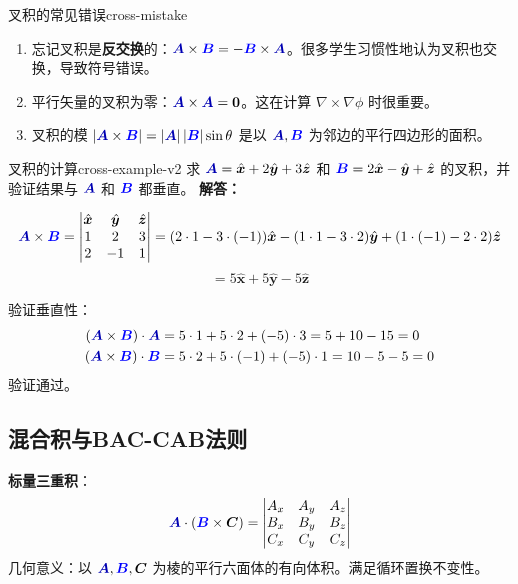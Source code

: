 \documentclass[11pt,a4paper,openany,oneside]{book}
\newcommand{\vecB}{\textcolor{blue}{\vect{B}}}
\newcommand{\vecA}{\textcolor{blue!70!black}{\vect{A}}}
\newcommand{\vect}[1]{\bm{#1}}
\newcommand{\unitvec}[1]{\hat{\vect{#1}}}
\newcommand{\difficulty}[1]{\marginnote{\textcolor{red}{\textbf{[#1]}}}}
\begin{document}
\begin{warning}{叉积的常见错误}{cross-mistake}
\begin{enumerate}
\item 忘记叉积是\textbf{反交换}的：$\vecA \times \vecB = -\vecB \times \vecA$。很多学生习惯性地认为叉积也交换，导致符号错误。
\item 平行矢量的叉积为零：$\vecA \times \vecA = \vect{0}$。这在计算 $\nabla \times \nabla\phi$ 时很重要。
\item 叉积的模 $|\vecA \times \vecB| = |\vecA|\,|\vecB|\sin\theta$ 是以 $\vecA, \vecB$ 为邻边的平行四边形的面积。
\end{enumerate}
\end{warning}

\begin{example}{叉积的计算}{cross-example-v2}
\difficulty{基础}
求 $\vecA = \unitvec{x} + 2\unitvec{y} + 3\unitvec{z}$ 和 $\vecB = 2\unitvec{x} - \unitvec{y} + \unitvec{z}$ 的叉积，并验证结果与 $\vecA$ 和 $\vecB$ 都垂直。
\tcblower
\textbf{解答：}

\[
\vecA \times \vecB = \begin{vmatrix}
\unitvec{x} & \unitvec{y} & \unitvec{z} \\
1 & 2 & 3 \\
2 & -1 & 1
\end{vmatrix}
= (2\cdot1 - 3\cdot(-1))\unitvec{x} - (1\cdot1 - 3\cdot2)\unitvec{y} + (1\cdot(-1) - 2\cdot2)\unitvec{z}
\]
\[
= 5\unitvec{x} + 5\unitvec{y} - 5\unitvec{z}
\]

验证垂直性：
\begin{align*}
(\vecA \times \vecB) \cdot \vecA &= 5\cdot1 + 5\cdot2 + (-5)\cdot3 = 5 + 10 - 15 = 0 \\
(\vecA \times \vecB) \cdot \vecB &= 5\cdot2 + 5\cdot(-1) + (-5)\cdot1 = 10 - 5 - 5 = 0
\end{align*}
验证通过。
\end{example}

\subsection{混合积与BAC-CAB法则}

\textbf{标量三重积}：
\[
\vecA \cdot (\vecB \times \vect{C}) = \begin{vmatrix}
A_x & A_y & A_z \\
B_x & B_y & B_z \\
C_x & C_y & C_z
\end{vmatrix}
\]
几何意义：以 $\vecA, \vecB, \vect{C}$ 为棱的平行六面体的有向体积。满足循环置换不变性。
\end{document}
